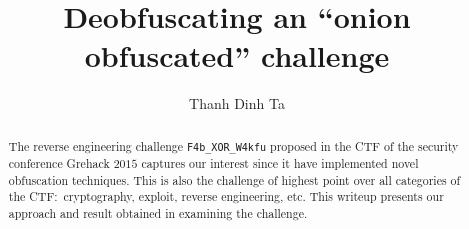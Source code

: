 \documentclass{easychair}
\begin{document}
\title{Deobfuscating an ``onion obfuscated'' challenge}

\author{
  Thanh Dinh Ta
}

\clearpage
\maketitle

\begin{abstract}
  The reverse engineering challenge \texttt{F4b\_XOR\_W4kfu} proposed in the CTF of the security conference Grehack $2015$ captures our interest since it have implemented novel obfuscation techniques. This is also the challenge of highest point over all categories of the CTF:~cryptography, exploit, reverse engineering, etc. This writeup presents our approach and result obtained in examining the challenge.
\end{abstract}



\printbibliography
\end{document}

